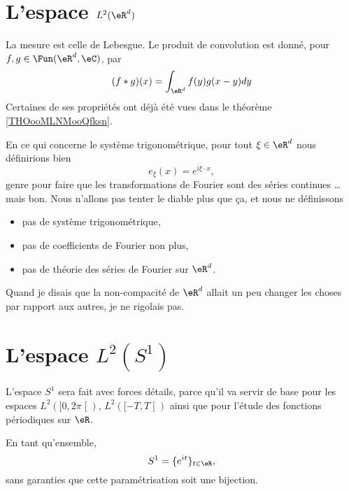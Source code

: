 \section{L'espace \( L^2(\eR^d)\)}

La mesure est celle de Lebesgue. Le produit de convolution est donné, pour \( f,g\in\Fun(\eR^d,\eC)\), par
\begin{equation}
    (f*g)(x)=\int_{\eR^d}f(y)g(x-y)dy
\end{equation}
Certaines de ses propriétés ont déjà été vues dans le théorème \ref{THOooMLNMooQfksn}.

En ce qui concerne le système trigonométrique, pour tout \( \xi\in \eR^d\) nous définirions bien
\begin{equation}
    e_{\xi}(x)= e^{i\xi\cdot x},
\end{equation}
genre pour faire que les transformations de Fourier sont des séries continues \ldots mais bon. Nous n'allons pas tenter le diable plus que ça, et nous ne définissons 
\begin{itemize}
    \item pas de système trigonométrique,
    \item pas de coefficients de Fourier non plus,
    \item pas de théorie des séries de Fourier sur \( \eR^d\).
\end{itemize}
Quand je disais que la non-compacité de \( \eR^d\) allait un peu changer les choses par rapport aux autres, je ne rigolais pas.

\section{L'espace \( L^2(S^1)\)}

L'espace \( S^1\) sera fait avec forces détails, parce qu'il va servir de base pour les espaces \( L^2(\mathopen[ 0 , 2\pi \mathclose[)\), \( L^2(\mathopen[ -T , T \mathclose[)\) ainsi que pour l'étude des fonctions périodiques sur \( \eR\).

En tant qu'ensemble,
\begin{equation}
    S^1=\{  e^{it} \}_{t\in \eR},
\end{equation}
sans garanties que cette paramétrisation soit une bijection.

